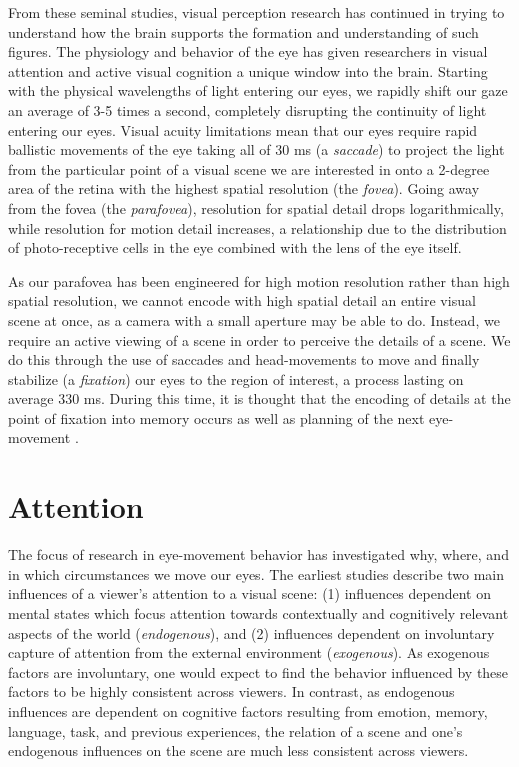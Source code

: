 \documentclass[a4paper,10pt,final]{ThesisStyle}
\begin{document}
From these seminal studies, visual perception research has continued in trying to understand how the brain supports the formation and understanding of such figures.  The physiology and behavior of the eye has given researchers in visual attention and active visual cognition a unique window into the brain.  Starting with the physical wavelengths of light entering our eyes, we rapidly shift our gaze an average of 3-5 times a second, completely disrupting the continuity of light entering our eyes.  Visual acuity limitations mean that our eyes require rapid ballistic movements of the eye taking all of 30 ms (a \textit{saccade}) to project the light from the particular point of a visual scene we are interested in onto a 2-degree area of the retina with the highest spatial resolution (the \textit{fovea}).  Going away from the fovea (the \textit{parafovea}), resolution for spatial detail drops logarithmically, while resolution for motion detail increases, a relationship due to the distribution of photo-receptive cells in the eye combined with the lens of the eye itself.  

As our parafovea has been engineered for high motion resolution rather than high spatial resolution, we cannot encode with high spatial detail an entire visual scene at once, as a camera with a small aperture may be able to do.  Instead, we require an active viewing of a scene in order to perceive the details of a scene.  We do this through the use of saccades and head-movements to move and finally stabilize (a \textit{fixation}) our eyes to the region of interest, a process lasting on average 330 ms.  During this time, it is thought that the encoding of details at the point of fixation into memory occurs as well as planning of the next eye-movement \cite{}.  

\section{Attention}

The focus of research in eye-movement behavior has investigated why, where, and in which circumstances we move our eyes.  The earliest studies \cite{Buswell1935,Yarbus1967} describe two main influences of a viewer's attention to a visual scene: (1) influences dependent on mental states which focus attention towards contextually and cognitively relevant aspects of the world (\textit{endogenous}), and (2) influences dependent on involuntary capture of attention from the external environment (\textit{exogenous}).  As exogenous factors are involuntary, one would expect to find the behavior influenced by these factors to be highly consistent across viewers.  In contrast, as endogenous influences are dependent on cognitive factors resulting from emotion, memory, language, task, and previous experiences, the relation of a scene and one's endogenous influences on the scene are much less consistent across viewers.  
\end{document}

